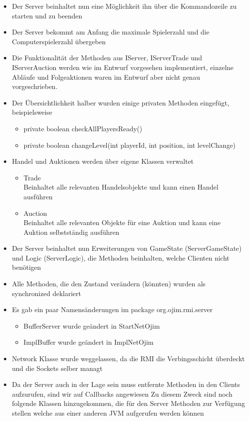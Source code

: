 \documentclass[a4paper,10pt]{article}
\begin{document}
\begin{itemize}
\item Der Server beinhaltet nun eine Möglichkeit ihn über die Kommandozeile zu starten und zu beenden
\item Der Server bekommt am Anfang die maximale Spielerzahl und die Computerspielerzahl übergeben
\item Die Funktionalität der Methoden aus IServer, IServerTrade und IServerAuction werden wie im Entwurf vorgesehen implementiert, einzelne Abläufe und Folgeaktionen waren im Entwurf aber nicht genau vorgeschrieben.
\item Der Übersichtlichkeit halber wurden einige privaten Methoden eingefügt, beispielsweise
\begin{itemize}
\item private boolean checkAllPlayersReady()
\item private boolean changeLevel(int playerId, int position, int levelChange)
\end{itemize}
\item Handel und Auktionen werden über eigene Klassen verwaltet
\begin{itemize}
\item Trade \\ Beinhaltet alle relevanten Handelsobjekte und kann einen Handel ausführen
\item Auction \\ Beinhaltet alle relevanten Objekte für eine Auktion und kann eine Auktion selbstständig ausführen
\end{itemize}
\item Der Server beinhaltet nun Erweiterungen von GameState (ServerGameState) und Logic (ServerLogic), die Methoden beinhalten, welche Clienten nicht benötigen
\item Alle Methoden, die den Zustand verändern (könnten) wurden als synchronized deklariert
\item Es gab ein paar Namensänderungen im package org.ojim.rmi.server 
\begin{itemize}
\item BufferServer wurde geändert in StartNetOjim
\item ImplBuffer wurde geändert in ImplNetOjim
\end{itemize}
\item Network Klasse wurde weggelassen, da die RMI die Verbingsschicht überdeckt und die Sockets selber managt
\item Da der Server auch in der Lage sein muss entfernte Methoden in den Clients aufzurufen, sind wir auf Callbacks angewiesen Zu diesem Zweck sind noch folgende Klassen hinzugekommen, die für den Server Methoden zur Verfügung stellen welche aus einer anderen JVM aufgerufen werden können

\end{itemize}
\end{document}
